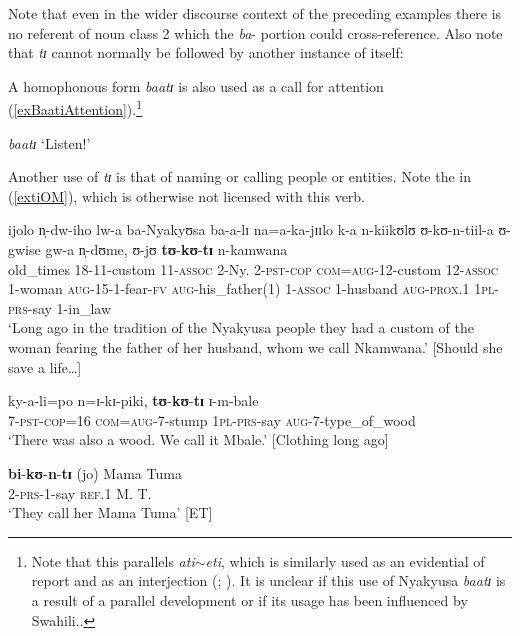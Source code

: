 Note that even in the wider discourse context of the preceding examples there is no referent of noun class 2 which the \textit{ba}- portion could cross-reference. Also note that \textit{tɪ} cannot normally be followed by another instance of itself:
\begin{exe}
\label{exNoTwoTi}
\end{exe}
 
A homophonous form \textit{baatɪ} is also used as a call for attention (\ref{exBaatiAttention}).\footnote{Note that this parallels  \textit{ati}$\sim$\textit{eti}, which is similarly used as an evidential of report and as an interjection (\citealt[17]{MadanA1903}; \citealt[19]{MawJ2013}). It is unclear if this use of Nyakyusa \textit{baatɪ} is a result of a parallel development or if its usage has been influenced by Swahili..}

\begin{exe}
\ex \label{exBaatiAttention}\textit{baatɪ} \lq Listen!'
\end{exe}

Another use of \textit{tɪ} is that of naming or calling people or entities. Note the  in (\ref{extiOM}), which is otherwise not licensed with this verb.
\begin{exe}
\ex \gll ijolo n̩-dw-iho lw-a ba-Nyakyʊsa ba-a-lɪ na=a-ka-jɪɪlo k-a n-kiikʊlʊ ʊ-kʊ-n-tiil-a ʊ-gwise gw-a n̩-dʊme, ʊ-jʊ \textbf{tʊ}-\textbf{kʊ}-\textbf{tɪ} n-kamwana\\
old\_times 18-11-custom 11-\textsc{assoc} 2-Ny. 2-\textsc{pst}-\textsc{cop} \textsc{com}=\textsc{aug}-12-custom 12-\textsc{assoc} 1-woman \textsc{aug}-15-1-fear-\textsc{fv} \textsc{aug}-his\_father(1) 1-\textsc{assoc} 1-husband \textsc{aug}-\textsc{prox.1} \textsc{1pl}-\textsc{prs}-say 1-in\_law\\
\glt `Long ago in the tradition of the Nyakyusa people they had a custom of the woman fearing the father of her husband, whom we call Nkamwana.' [Should she save a life\ldots]

\ex \gll ky-a-li=po n=ɪ-kɪ-piki, \textbf{tʊ}-\textbf{kʊ}-\textbf{tɪ} ɪ-m-bale\\
7-\textsc{pst}-\textsc{cop}=16 \textsc{com}=\textsc{aug}-7-stump \textsc{1pl}-\textsc{prs}-say \textsc{aug}-7-type\_of\_wood\\
\glt \lq There was also a wood. We call it Mbale.' [Clothing long ago]

\ex \label{extiOM} \gll \textbf{bi}-\textbf{kʊ}-\textbf{n}-\textbf{tɪ} (jo) Mama Tuma\\ 2-\textsc{prs}-1-say \textsc{ref.1} M. T.\\\glt `They call her Mama Tuma' [ET]
\end{exe}

